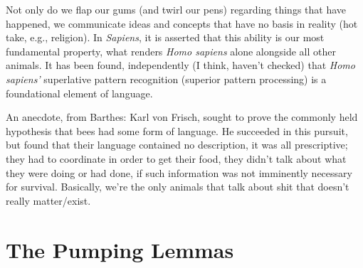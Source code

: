 \documentclass[../butidigress.tex]{subfiles}
\begin{document}
Not only do we flap our gums (and twirl our pens) regarding things that have happened, we communicate ideas and concepts that have no basis in reality (hot take, e.g., religion). In \emph{Sapiens}, it is asserted that this ability is our most fundamental property, what renders \emph{Homo sapiens} alone alongside all other animals.
It has been found, independently (I think, haven't checked) that \emph{Homo sapiens'} superlative pattern recognition (superior pattern processing) is a foundational element of language.

An anecdote, from Barthes: Karl von Frisch, sought to prove the commonly held hypothesis that bees had some form of language.
He succeeded in this pursuit, but found that their language contained no description, it was all prescriptive; they had to coordinate in order to get their food, they didn't talk about what they were doing or had done, if such information was not imminently necessary for survival.
Basically, we're the only animals that talk about shit that doesn't really matter/exist.

\section{The Pumping Lemmas}

\end{document}
